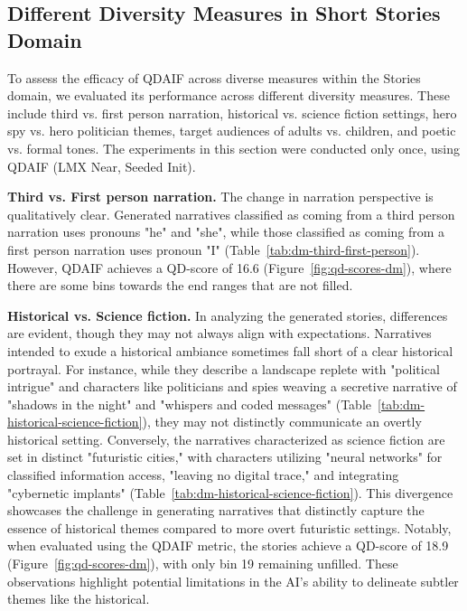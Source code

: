 \subsection{Different Diversity Measures in Short Stories Domain}
\label{app:diff-diversity-measures}
To assess the efficacy of QDAIF across diverse measures within the Stories domain, we evaluated its performance across different diversity measures. These include third vs. first person narration, historical vs. science fiction settings, hero spy vs. hero politician themes, target audiences of adults vs. children, and poetic vs. formal tones. The experiments in this section were conducted only once, using QDAIF (LMX Near, Seeded Init).

\textbf{Third vs. First person narration.} The change in narration perspective is qualitatively clear. Generated narratives classified as coming from a third person narration uses pronouns "he" and "she", while those classified as coming from a first person narration uses pronoun "I" (Table~\ref{tab:dm-third-first-person}). However, QDAIF achieves a QD-score of 16.6 (Figure~\ref{fig:qd-scores-dm}), where there are some bins towards the end ranges that are not filled.

\textbf{Historical vs. Science fiction.} In analyzing the generated stories, differences are evident, though they may not always align with expectations. Narratives intended to exude a historical ambiance sometimes fall short of a clear historical portrayal. For instance, while they describe a landscape replete with "political intrigue" and characters like politicians and spies weaving a secretive narrative of "shadows in the night" and "whispers and coded messages" (Table~\ref{tab:dm-historical-science-fiction}), they may not distinctly communicate an overtly historical setting. Conversely, the narratives characterized as science fiction are set in distinct "futuristic cities," with characters utilizing "neural networks" for classified information access, "leaving no digital trace," and integrating "cybernetic implants" (Table~\ref{tab:dm-historical-science-fiction}). This divergence showcases the challenge in generating narratives that distinctly capture the essence of historical themes compared to more overt futuristic settings. Notably, when evaluated using the QDAIF metric, the stories achieve a QD-score of 18.9 (Figure~\ref{fig:qd-scores-dm}), with only bin 19 remaining unfilled. These observations highlight potential limitations in the AI's ability to delineate subtler themes like the historical.

